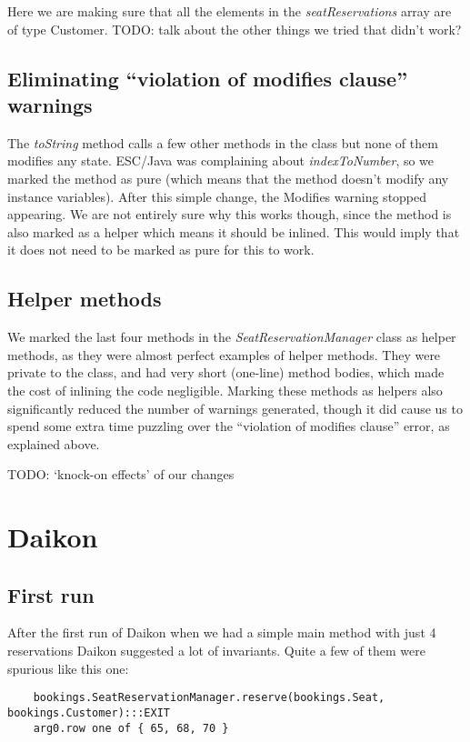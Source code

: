 \documentclass{article}
\begin{document}
{Here we are making sure that all the elements in the \emph{seatReservations} array are of type Customer.
TODO: talk about the other things we tried that didn't work?

\subsection{Eliminating ``violation of modifies clause'' warnings}

The \emph{toString} method calls a few other methods in the class but none of them modifies any state. ESC/Java was complaining about \emph{indexToNumber}, so we marked the method as pure (which means that the method doesn't modify any instance variables). After this simple change, the Modifies warning stopped appearing. We are not entirely sure why this works though, since the method is also marked as a helper which means it should be inlined. This would imply that it does not need to be marked as pure for this to work.

\subsection{Helper methods}

We marked the last four methods in the \emph{SeatReservationManager} class as helper methods, as they were almost perfect examples of helper methods. They were private to the class, and had very short (one-line) method bodies, which made the cost of inlining the code negligible. Marking these methods as helpers also significantly reduced the number of warnings generated, though it did cause us to spend some extra time puzzling over the ``violation of modifies clause'' error, as explained above.

TODO: `knock-on effects' of our changes

\section{Daikon}

\subsection{First run}

After the first run of Daikon when we had a simple main method with just 4 reservations Daikon suggested a lot of invariants. Quite a few of them were spurious like this one:

\begin{verbatim}
    bookings.SeatReservationManager.reserve(bookings.Seat, bookings.Customer):::EXIT
    arg0.row one of { 65, 68, 70 }
\end{verbatim}

}
\end{document}
